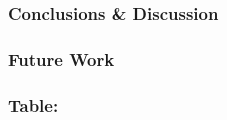 \documentclass{beamer}
\begin{document}
\begin{frame}
\frametitle{Conclusions \& Discussion}
\end{frame}


\begin{frame}
\frametitle{Future Work}
\end{frame}


\begin{frame}
\frametitle{Table: }
\end{frame}
\end{document}
